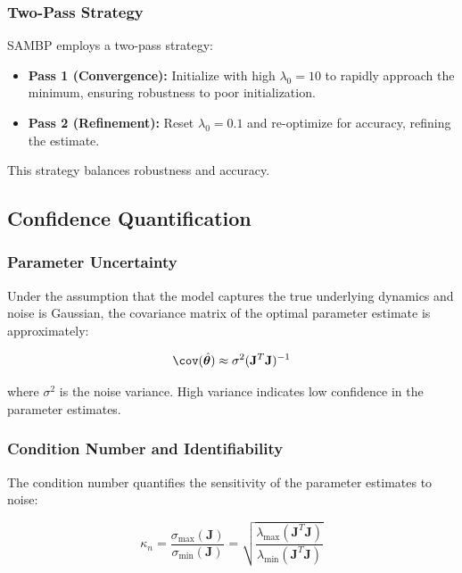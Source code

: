 \documentclass[12pt,a4paper]{article}
\newcommand{\hattheta}{\hat{\boldsymbol{\theta}}}
\newcommand{\kappan}{\kappa_n}
\begin{document}
\subsubsection{Two-Pass Strategy}

SAMBP employs a two-pass strategy:

\begin{itemize}
    \item \textbf{Pass 1 (Convergence):} Initialize with high $\lambda_0 = 10$ to rapidly 
    approach the minimum, ensuring robustness to poor initialization.
    
    \item \textbf{Pass 2 (Refinement):} Reset $\lambda_0 = 0.1$ and re-optimize for accuracy, 
    refining the estimate.
\end{itemize}

This strategy balances robustness and accuracy.

\subsection{Confidence Quantification}
\label{subsec:confidence}

\subsubsection{Parameter Uncertainty}

Under the assumption that the model captures the true underlying dynamics and noise 
is Gaussian, the covariance matrix of the optimal parameter estimate is approximately:

\begin{equation}
\cov(\hattheta) \approx \sigma^2 (\mathbf{J}^T \mathbf{J})^{-1}
\label{eq:param_cov}
\end{equation}

where $\sigma^2$ is the noise variance. High variance indicates low confidence in the 
parameter estimates.

\subsubsection{Condition Number and Identifiability}

The condition number quantifies the sensitivity of the parameter estimates to noise:

\begin{equation}
\kappan = \frac{\sigma_{\max}(\mathbf{J})}{\sigma_{\min}(\mathbf{J})} = \sqrt{\frac{\lambda_{\max}(\mathbf{J}^T\mathbf{J})}{\lambda_{\min}(\mathbf{J}^T\mathbf{J})}}
\label{eq:condition_number}
\end{equation}
\end{document}
